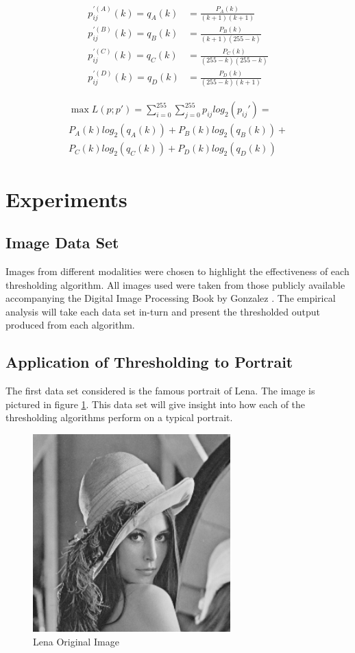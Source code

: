 \documentclass[journal]{IEEEtran}
\begin{document}
\begin{align}
p_{ij}^{'(A)}(k) = q_A(k) &= \frac{P_A(k)}{(k+1)(k+1)} \\
p_{ij}^{'(B)}(k) = q_B(k) &= \frac{P_B(k)}{(k+1)(255-k)} \\
p_{ij}^{'(C)}(k) = q_C(k) &= \frac{P_C(k)}{(255-k)(255-k)} \\
p_{ij}^{'(D)}(k) = q_D(k) &= \frac{P_D(k)}{(255-k)(k+1)}
\end{align}

\begin{multline}
\label{eq:chang}
\max L(p;p') = \sum_{i=0}^{255} \sum_{j=0}^{255}p_{ij}log_2(p_{ij}') = \\
P_A(k)log_2(q_A(k)) + P_B(k)log_2(q_B(k)) + \\ P_C(k)log_2(q_C(k)) + P_D(k)log_2(q_D(k))
\end{multline}

\section{Experiments}
\subsection{Image Data Set}
\par Images from different modalities were chosen to highlight the effectiveness of each thresholding algorithm. All images used were taken from those publicly available accompanying the Digital Image Processing Book by Gonzalez \cite{bworld}. The empirical analysis will take each data set in-turn and present the thresholded output produced from each algorithm.

\subsection{Application of Thresholding to Portrait}
\par The first data set considered is the famous portrait of Lena. The image is pictured in figure \ref{fig:lena}. This data set will give insight into how each of the thresholding algorithms perform on a typical portrait.

\begin{figure}[!h]
\centering
\includegraphics[width=3in]{../images/lena_gray_256.png}
\caption{Lena Original Image}
\label{fig:lena}
\end{figure}
\end{document}
